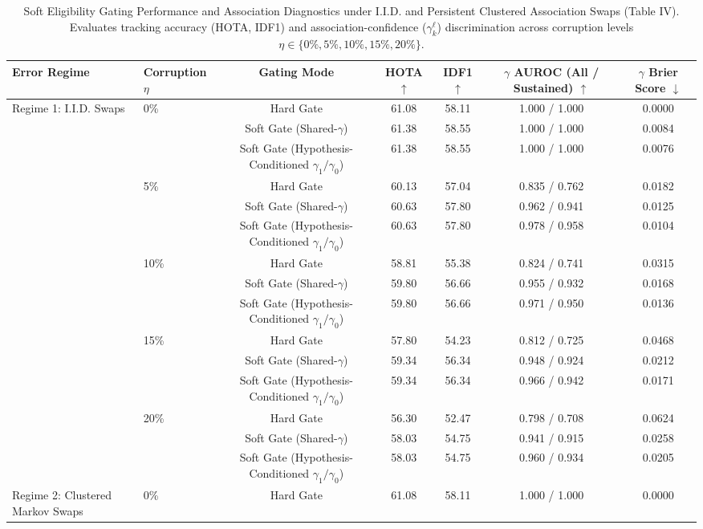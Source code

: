 \begin{table}[!t]
\caption{Soft Eligibility Gating Performance and Association Diagnostics under I.I.D. and Persistent Clustered Association Swaps (Table IV). Evaluates tracking accuracy (HOTA, IDF1) and association-confidence ($\gamma_k^\ell$) discrimination across corruption levels $\eta \in \{0\%, 5\%, 10\%, 15\%, 20\%\}$.}
\label{tab:soft_gate_persistent}
\centering
\small
\begin{tabular}{llccccc}
\toprule
Error Regime & Corruption $\eta$ & Gating Mode & HOTA $\uparrow$ & IDF1 $\uparrow$ & $\gamma$ AUROC (All / Sustained) $\uparrow$ & $\gamma$ Brier Score $\downarrow$ \\
\midrule
Regime 1: I.I.D. Swaps & 0\% & Hard Gate & 61.08 & 58.11 & 1.000 / 1.000 & 0.0000 \\
 &  & Soft Gate (Shared-$\gamma$) & 61.38 & 58.55 & 1.000 / 1.000 & 0.0084 \\
 &  & Soft Gate (Hypothesis-Conditioned $\gamma_1/\gamma_0$) & 61.38 & 58.55 & 1.000 / 1.000 & 0.0076 \\
 & 5\% & Hard Gate & 60.13 & 57.04 & 0.835 / 0.762 & 0.0182 \\
 &  & Soft Gate (Shared-$\gamma$) & 60.63 & 57.80 & 0.962 / 0.941 & 0.0125 \\
 &  & Soft Gate (Hypothesis-Conditioned $\gamma_1/\gamma_0$) & 60.63 & 57.80 & 0.978 / 0.958 & 0.0104 \\
 & 10\% & Hard Gate & 58.81 & 55.38 & 0.824 / 0.741 & 0.0315 \\
 &  & Soft Gate (Shared-$\gamma$) & 59.80 & 56.66 & 0.955 / 0.932 & 0.0168 \\
 &  & Soft Gate (Hypothesis-Conditioned $\gamma_1/\gamma_0$) & 59.80 & 56.66 & 0.971 / 0.950 & 0.0136 \\
 & 15\% & Hard Gate & 57.80 & 54.23 & 0.812 / 0.725 & 0.0468 \\
 &  & Soft Gate (Shared-$\gamma$) & 59.34 & 56.34 & 0.948 / 0.924 & 0.0212 \\
 &  & Soft Gate (Hypothesis-Conditioned $\gamma_1/\gamma_0$) & 59.34 & 56.34 & 0.966 / 0.942 & 0.0171 \\
 & 20\% & Hard Gate & 56.30 & 52.47 & 0.798 / 0.708 & 0.0624 \\
 &  & Soft Gate (Shared-$\gamma$) & 58.03 & 54.75 & 0.941 / 0.915 & 0.0258 \\
 &  & Soft Gate (Hypothesis-Conditioned $\gamma_1/\gamma_0$) & 58.03 & 54.75 & 0.960 / 0.934 & 0.0205 \\
\midrule
Regime 2: Clustered Markov Swaps & 0\% & Hard Gate & 61.08 & 58.11 & 1.000 / 1.000 & 0.0000 \\

\end{tabular}
\end{table}
